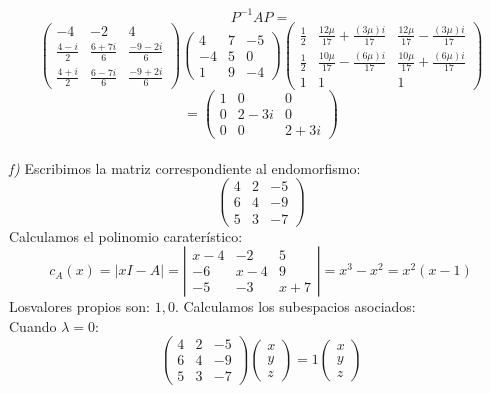 \documentclass{article}
\begin{document}
$$
P^{-1}AP=
$$
$$
\left( \begin{array}{ccc}
     -4 & -2 & 4 \\
     \frac{4-i}{2} & \frac{6+7i}{6} & \frac{-9-2i}{6} \\
     \frac{4+i}{2} & \frac{6-7i}{6} & \frac{-9+2i}{6}
\end{array}\right)
\left( \begin{array}{ccc}
     4 & 7 & -5 \\
     -4 & 5 & 0 \\
     1 & 9 & -4 
\end{array}\right)
\left( \begin{array}{ccc}
     \frac{1}{2} & \frac{12\mu}{17}+\frac{(3\mu)i}{17} & \frac{12\mu}{17}-\frac{(3\mu)i}{17} \\
     \frac{1}{2} & \frac{10\mu}{17}-\frac{(6\mu)i}{17} & \frac{10\mu}{17}+\frac{(6\mu)i}{17} \\
     1 & 1 & 1 
\end{array}\right)
$$
$$
=
\left( \begin{array}{ccc}
     1 & 0 & 0 \\
     0 & 2-3i & 0 \\
     0 & 0 & 2+3i 
\end{array}\right)
$$\\
%
%
%
%
\textit{f)}
Escribimos la matriz correspondiente al endomorfismo:\\
$$
\left( \begin{array}{ccc}
    4 & 2 & -5\\
    6 & 4 & -9\\
    5 & 3 & -7
\end{array} \right)
$$
Calculamos el polinomio caraterístico:
$$
c_A(x) = |xI-A| = 
\left| \begin{array}{ccc}
    x-4 & -2 & 5\\
    -6 & x-4 & 9\\
    -5 & -3 & x+7
\end{array} \right| =
x^3-x^2 = x^2(x-1)
$$
Losvalores propios son: $1,0$. Calculamos los subespacios asociados:\\
Cuando $\lambda=0$:
$$
\left( \begin{array}{ccc}
    4 & 2 & -5\\
    6 & 4 & -9\\
    5 & 3 & -7
\end{array} \right)
\left( \begin{array}{c}
      x \\
      y \\
      z
\end{array} \right) = 1
\left( \begin{array}{c}
      x \\
      y \\
      z
\end{array} \right)
$$
\end{document}

